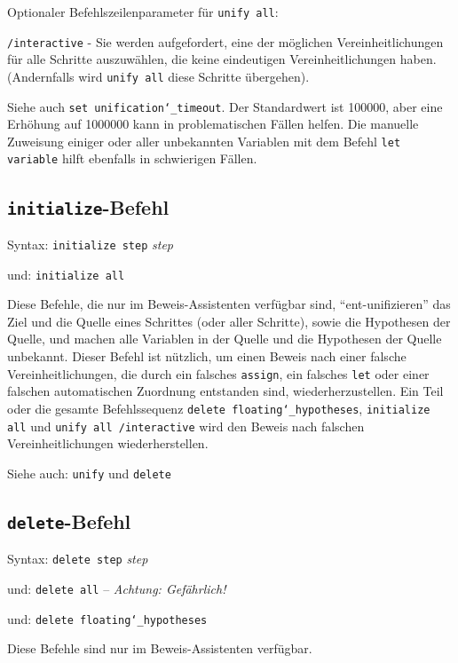 Optionaler Befehlszeilenparameter für \texttt{unify all}:

    \texttt{/interactive} - Sie werden aufgefordert, eine der möglichen Vereinheitlichungen für alle Schritte auszuwählen, die keine eindeutigen Vereinheitlichungen haben.  (Andernfalls wird \texttt{unify all} diese Schritte übergehen).

Siehe auch \texttt{set unification{\char`\_}timeout}.  Der Standardwert ist 100000, aber eine Erhöhung auf 1000000 kann in problematischen Fällen helfen.  Die manuelle Zuweisung einiger oder aller unbekannten Variablen mit dem Befehl \texttt{let variable} hilft ebenfalls in schwierigen Fällen.


\subsection{\texttt{initialize}-Befehl}

Syntax:  \texttt{initialize step} {\em step}

    und: \texttt{initialize all}

Diese Befehle, die nur im Beweis-Assistenten verfügbar sind, "`ent-unifizie\-ren"' das Ziel und die Quelle eines Schrittes (oder aller Schritte), sowie die Hypothesen der Quelle, und machen alle Variablen in der Quelle und die Hypothesen der Quelle unbekannt.  Dieser Befehl ist nützlich, um einen Beweis nach einer falsche Vereinheitlichungen, die durch ein falsches \texttt{assign}, ein falsches \texttt{let} oder einer falschen automatischen Zuordnung entstanden sind, wiederherzustellen.  Ein Teil oder die gesamte Befehlssequenz \texttt{delete floating{\char`\_}hypotheses}, \texttt{initialize all} und \texttt{unify all /interactive}\linebreak
wird den Beweis nach falschen Vereinheitlichungen wiederherstellen.

Siehe auch:  \texttt{unify} und \texttt{delete}


\subsection{\texttt{delete}-Befehl}
Syntax:  \texttt{delete step} {\em step}

   und:      \texttt{delete all} -- {\em Achtung: Gefährlich!}

   und:      \texttt{delete floating{\char`\_}hypotheses}

Diese Befehle sind nur im Beweis-Assistenten verfügbar.

